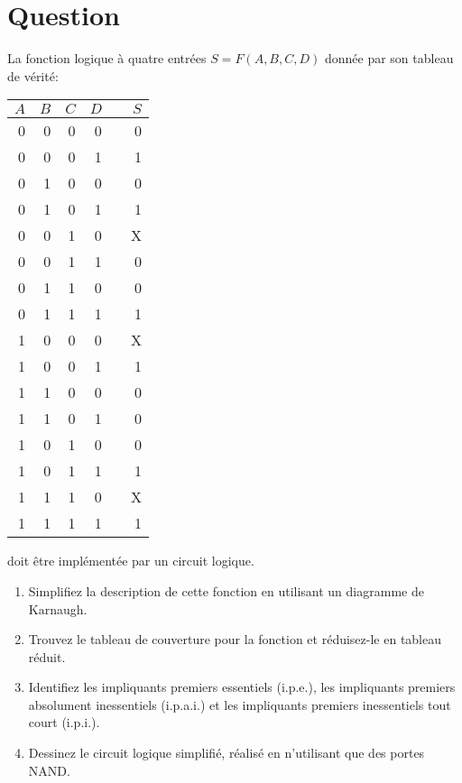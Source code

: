 \documentclass[letter, oneside]{book}
\begin{document}
\section*{Question}
\label{sec:orgb594924}
La fonction logique à quatre entrées \(S = F(A,B,C, D)\) donnée par son 
  tableau de vérité:
\begin{center}
\begin{tabular}{rrrrlr}
\(A\) & \(B\) & \(C\) & \(D\) &  & \(S\)\\[0pt]
\hline
0 & 0 & 0 & 0 &  & 0\\[0pt]
0 & 0 & 0 & 1 &  & 1\\[0pt]
0 & 1 & 0 & 0 &  & 0\\[0pt]
0 & 1 & 0 & 1 &  & 1\\[0pt]
0 & 0 & 1 & 0 &  & X\\[0pt]
0 & 0 & 1 & 1 &  & 0\\[0pt]
0 & 1 & 1 & 0 &  & 0\\[0pt]
0 & 1 & 1 & 1 &  & 1\\[0pt]
1 & 0 & 0 & 0 &  & X\\[0pt]
1 & 0 & 0 & 1 &  & 1\\[0pt]
1 & 1 & 0 & 0 &  & 0\\[0pt]
1 & 1 & 0 & 1 &  & 0\\[0pt]
1 & 0 & 1 & 0 &  & 0\\[0pt]
1 & 0 & 1 & 1 &  & 1\\[0pt]
1 & 1 & 1 & 0 &  & X\\[0pt]
1 & 1 & 1 & 1 &  & 1\\[0pt]
\end{tabular}
\end{center}
doit être implémentée par un circuit logique.

\begin{enumerate}
\item Simplifiez la description de cette fonction en utilisant un diagramme de Karnaugh.

\item Trouvez le tableau de couverture pour la fonction et réduisez-le en tableau réduit.

\item Identifiez les impliquants premiers essentiels (i.p.e.), les
impliquants premiers absolument inessentiels (i.p.a.i.) et les
impliquants premiers inessentiels tout court (i.p.i.).

\item Dessinez le circuit logique simplifié, réalisé en n'utilisant que des portes NAND.
\end{enumerate}
\end{document}
